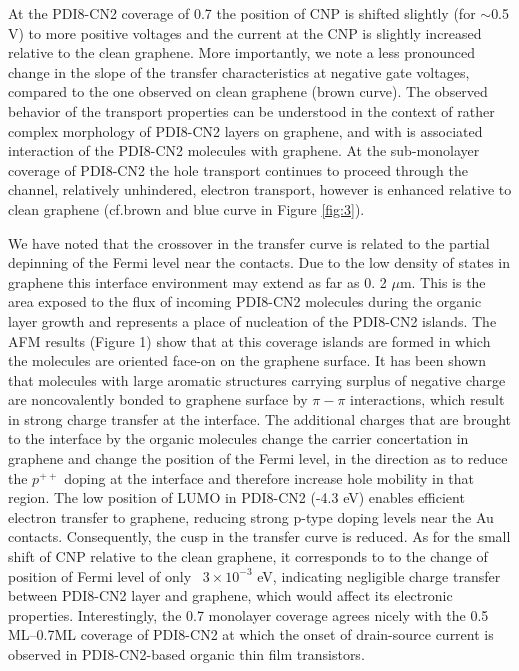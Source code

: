 \documentclass[preprint,aip,jap]{revtex4-2}
\begin{document}
At the PDI8-CN2 coverage of 0.7 the position of CNP is shifted slightly (for $\sim$0.5 V)  to more positive voltages and the current at the CNP is slightly increased relative to the clean graphene.
  More importantly, we note a less pronounced change in the slope of the transfer characteristics at negative gate voltages, compared to the one observed on clean graphene (brown curve).
 The observed behavior of the transport properties can be understood in the context of rather complex morphology of PDI8-CN2 layers on graphene, and with is associated interaction of the PDI8-CN2 molecules with graphene.
 At the sub-monolayer coverage of PDI8-CN2 the hole transport continues to proceed through the channel, relatively unhindered, electron transport, however is enhanced relative to clean graphene (cf.brown and blue curve in Figure \ref{fig:3}).

 We have noted that the crossover in the transfer curve is related to the partial depinning of the Fermi level near the contacts.
 Due to the low density of states in graphene this interface environment may extend as far as 0.
2 $\mu$m\cite{mueller-2009}.
 This is the area exposed to the flux of incoming PDI8-CN2 molecules during the organic layer growth and represents a place of nucleation of the PDI8-CN2 islands.
 The AFM results (Figure 1) show that at this coverage islands are formed in which the molecules are oriented face-on on the graphene surface.
 It has been shown\cite{su-2009} that molecules with large aromatic structures carrying surplus of negative charge are noncovalently bonded to graphene surface by $\pi-\pi$ interactions, which result in strong charge transfer at the interface.
 The additional charges that are brought to the interface by the organic molecules change the carrier concertation in graphene and change the position of the Fermi level, in the direction as to reduce the $p^{++}$ doping at the interface and therefore increase hole mobility in that region.
 The low position of LUMO in PDI8-CN2 (-4.3 eV)\cite{jones-2007} enables efficient electron transfer to graphene, reducing strong p-type doping levels near the Au contacts.
 Consequently, the cusp in the transfer curve is reduced.
   As for the small shift of CNP relative to the clean graphene, it corresponds to to the change of position of Fermi level of only ~$3\times10^{-3}$ eV, indicating negligible charge transfer between PDI8-CN2 layer and graphene, which would affect its electronic properties.
 Interestingly, the 0.7 monolayer coverage agrees nicely with the 0.5 ML--0.7ML coverage of PDI8-CN2 at which the onset of  drain-source current is observed in PDI8-CN2-based organic thin film transistors\cite{liscio-2013}.
\end{document}
